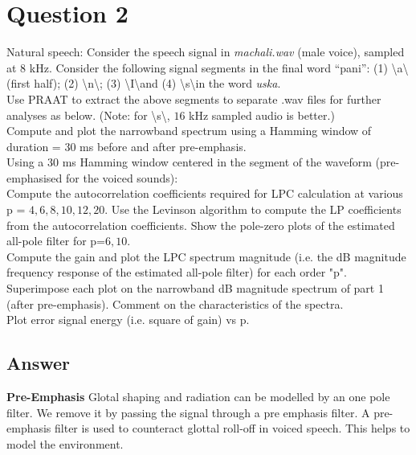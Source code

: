 \documentclass[a4paper]{article}
\begin{document}
\newpage


\section{Question 2}
Natural speech: Consider the speech signal in \textit{machali.wav} (male voice), sampled at $8$ kHz.  Consider the following signal segments in the final word “pani”:  (1)  \textbackslash a\textbackslash   (first half);  (2) \textbackslash n\textbackslash ;  (3) \textbackslash I\textbackslash  and (4) \textbackslash s\textbackslash in the word \textit{uska}.  \\ 

Use PRAAT to extract the above segments to separate .wav files for further analyses as below.  (Note: for \textbackslash s\textbackslash, $16$ kHz sampled audio is better.) \\ 

Compute and plot the narrowband spectrum using a Hamming window of duration = $30$ ms before and after pre-emphasis. \\ 

Using a 30 ms Hamming window centered in the segment of the waveform (pre-emphasised for the voiced sounds): \\ 

Compute the autocorrelation coefficients required for LPC calculation at various p = $4,6,8,10,12,20$.  Use the Levinson algorithm to compute the LP coefficients from the autocorrelation coefficients. Show the pole-zero plots of the estimated all-pole filter for p=$6,10$.  \\ 

Compute the gain and plot the LPC spectrum magnitude (i.e. the dB magnitude frequency response of the estimated all-pole filter) for each order "p". Superimpose each plot on the narrowband dB magnitude spectrum of part 1 (after pre-emphasis). Comment on the characteristics of the spectra. \\ 
 
Plot error signal energy (i.e. square of gain) vs p. \\ 

\subsection{Answer}

\textbf{Pre-Emphasis}
Glotal shaping and radiation can be modelled by an one pole filter. We remove it by passing the signal through a pre emphasis filter. A pre-emphasis filter is used to counteract glottal roll-off in voiced speech. This helps to model the environment. 
\end{document}
